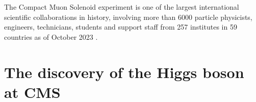 The Compact Muon Solenoid experiment is one of the largest international scientific collaborations in history, involving more than 6000 particle physicists, engineers, technicians, students and support staff from 257 institutes in 59 countries as of October 2023 \cite{CERN:CMS_people}.

\section{The discovery of the Higgs boson at CMS}

